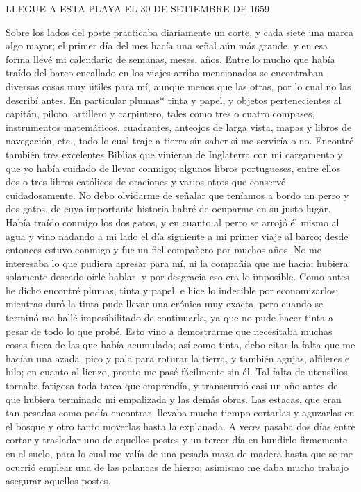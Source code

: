 \documentclass{novela}
\begin{document}
    LLEGUE A ESTA PLAYA EL
    30 DE SETIEMBRE DE 1659


    Sobre los lados del poste practicaba diariamente un corte, y cada siete una marca algo mayor; el primer día del mes hacía una señal aún más grande, y en esa forma llevé mi calendario de semanas, meses, años.
    Entre lo mucho que había traído del barco encallado en los viajes arriba mencionados se encontraban diversas cosas muy útiles para mí, aunque menos que las otras, por lo cual no las describí antes. En particular plumas* tinta y papel, y objetos pertenecientes al capitán, piloto, artillero y carpintero, tales como tres o cuatro compases, instrumentos matemáticos, cuadrantes, anteojos de larga vista, mapas y libros de navegación, etc., todo lo cual traje a tierra sin saber si me serviría o no. Encontré también tres excelentes Biblias que vinieran de Inglaterra con mi cargamento y que yo había cuidado de llevar conmigo; algunos libros portugueses, entre ellos dos o tres libros católicos de oraciones y varios otros que conservé cuidadosamente. No debo olvidarme de señalar que teníamos a bordo un perro y dos gatos, de cuya importante historia habré de ocuparme en su justo lugar. Había traído conmigo los dos gatos, y en cuanto al perro se arrojó él mismo al agua y vino nadando a mi lado el día siguiente a mi primer viaje al barco; desde entonces estuvo conmigo y fue un fiel compañero por muchos años. No me interesaba lo que pudiera apresar para mí, ni la compañía que me hacía; hubiera solamente deseado oírle hablar, y por desgracia eso era lo imposible.
    Como antes he dicho encontré plumas, tinta y papel, e hice lo indecible por economizarlos; mientras duró la tinta pude llevar una crónica muy exacta, pero cuando se terminó me hallé imposibilitado de continuarla, ya que no pude hacer tinta a pesar de todo lo que probé. Esto vino a demostrarme que necesitaba muchas cosas fuera de las que había acumulado; así como tinta, debo citar la falta que me hacían una azada, pico y pala para roturar la tierra, y también agujas, alfileres e hilo; en cuanto al lienzo, pronto me pasé fácilmente sin él.
    Tal falta de utensilios tornaba fatigosa toda tarea que emprendía, y transcurrió casi un año antes de que hubiera terminado mi empalizada y las demás obras. Las estacas, que eran tan pesadas como podía encontrar, llevaba mucho tiempo cortarlas y aguzarlas en el bosque y otro tanto moverlas hasta la explanada. A veces pasaba dos días entre cortar y trasladar uno de aquellos postes y un tercer día en hundirlo firmemente en el suelo, para lo cual me valía de una pesada maza de madera hasta que se me ocurrió emplear una de las palancas de hierro; asimismo me daba mucho trabajo asegurar aquellos postes.
\end{document}
